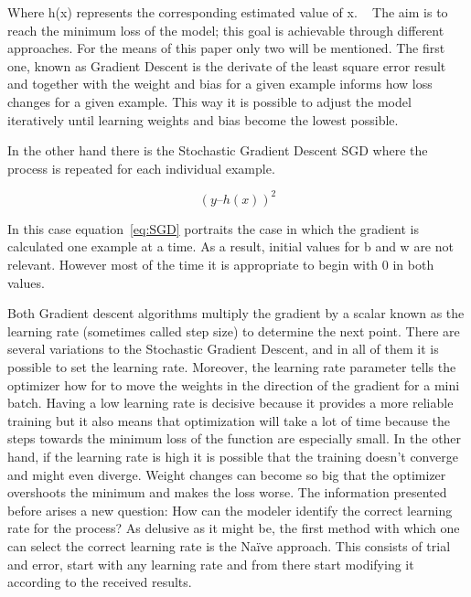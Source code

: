 Where h(x) represents the corresponding estimated value of x. ~\cite{rish15} 
The aim is to reach the minimum loss of the model; this goal is achievable through different approaches. For the means of this paper only two will be mentioned. The first one, known as Gradient Descent is the derivate of the least square error result and together with the weight and bias for a given example informs how loss changes for a given example. This way it is possible to adjust the model iteratively until learning weights and bias become the lowest possible. 

In the other hand there is the Stochastic Gradient Descent \ac{SGD} where the process is repeated for each individual example.

\begin{equation} \label{eq:SGD}
(y – h(x))^2
\end{equation}


In this case equation~\ref{eq:SGD} portraits the case in which the gradient is calculated one example at a time. As a result, initial values for b and w are not relevant. However most of the time it is appropriate to begin with 0 in both values.

Both Gradient descent algorithms multiply the gradient by a scalar known as the learning rate (sometimes called step size) to determine the next point.  There are several variations to the Stochastic Gradient Descent, and in all of them it is possible to set the learning rate.  Moreover, the learning rate parameter tells the optimizer how for to move the weights in the direction of the gradient for a mini batch. Having a low learning rate is decisive because it provides a more reliable training but it also means that optimization will take a lot of time because the steps towards the minimum loss of the function are especially small. In the other hand, if the learning rate is high it is possible that the training doesn’t converge and might even diverge.  Weight changes can become so big that the optimizer overshoots the minimum and makes the loss worse. The information presented before arises a new question: How can the modeler identify the correct learning rate for the process? 
As delusive as it might be, the first method with which one can select the correct learning rate is the Naïve approach. This consists of trial and error, start with any learning rate and from there start modifying it according to the received results. 

